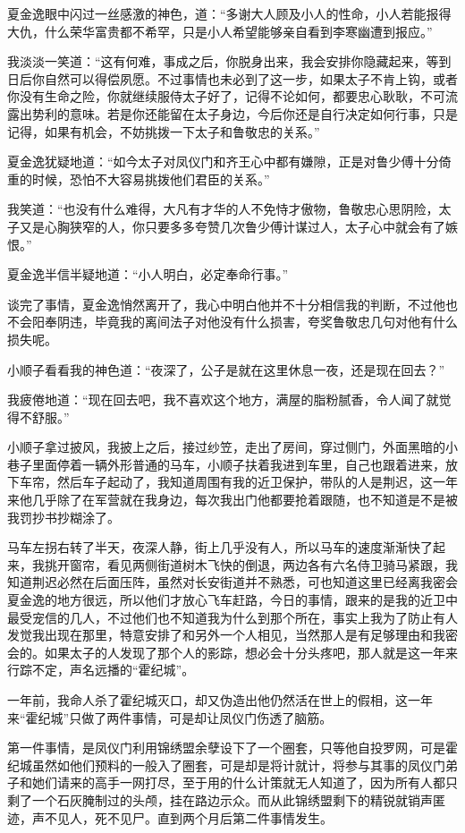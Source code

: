 夏金逸眼中闪过一丝感激的神色，道：“多谢大人顾及小人的性命，小人若能报得大仇，什么荣华富贵都不希罕，只是小人希望能够亲自看到李寒幽遭到报应。”

我淡淡一笑道：“这有何难，事成之后，你脱身出来，我会安排你隐藏起来，等到日后你自然可以得偿夙愿。不过事情也未必到了这一步，如果太子不肯上钩，或者你没有生命之险，你就继续服侍太子好了，记得不论如何，都要忠心耿耿，不可流露出势利的意味。若是你还能留在太子身边，今后你还是自行决定如何行事，只是记得，如果有机会，不妨挑拨一下太子和鲁敬忠的关系。”

夏金逸犹疑地道：“如今太子对凤仪门和齐王心中都有嫌隙，正是对鲁少傅十分倚重的时候，恐怕不大容易挑拨他们君臣的关系。”

我笑道：“也没有什么难得，大凡有才华的人不免恃才傲物，鲁敬忠心思阴险，太子又是心胸狭窄的人，你只要多多夸赞几次鲁少傅计谋过人，太子心中就会有了嫉恨。”

夏金逸半信半疑地道：“小人明白，必定奉命行事。”

谈完了事情，夏金逸悄然离开了，我心中明白他并不十分相信我的判断，不过他也不会阳奉阴违，毕竟我的离间法子对他没有什么损害，夸奖鲁敬忠几句对他有什么损失呢。

小顺子看看我的神色道：“夜深了，公子是就在这里休息一夜，还是现在回去？”

我疲倦地道：“现在回去吧，我不喜欢这个地方，满屋的脂粉腻香，令人闻了就觉得不舒服。”

小顺子拿过披风，我披上之后，接过纱笠，走出了房间，穿过侧门，外面黑暗的小巷子里面停着一辆外形普通的马车，小顺子扶着我进到车里，自己也跟着进来，放下车帘，然后车子起动了，我知道周围有我的近卫保护，带队的人是荆迟，这一年来他几乎除了在军营就在我身边，每次我出门他都要抢着跟随，也不知道是不是被我罚抄书抄糊涂了。

马车左拐右转了半天，夜深人静，街上几乎没有人，所以马车的速度渐渐快了起来，我挑开窗帘，看见两侧街道树木飞快的倒退，两边各有六名侍卫骑马紧跟，我知道荆迟必然在后面压阵，虽然对长安街道并不熟悉，可也知道这里已经离我密会夏金逸的地方很远，所以他们才放心飞车赶路，今日的事情，跟来的是我的近卫中最受宠信的几人，不过他们也不知道我为什么到那个所在，事实上我为了防止有人发觉我出现在那里，特意安排了和另外一个人相见，当然那人是有足够理由和我密会的。如果太子的人发现了那个人的影踪，想必会十分头疼吧，那人就是这一年来行踪不定，声名远播的“霍纪城”。

一年前，我命人杀了霍纪城灭口，却又伪造出他仍然活在世上的假相，这一年来“霍纪城”只做了两件事情，可是却让凤仪门伤透了脑筋。

第一件事情，是凤仪门利用锦绣盟余孽设下了一个圈套，只等他自投罗网，可是霍纪城虽然如他们预料的一般入了圈套，可是却是将计就计，将参与其事的凤仪门弟子和她们请来的高手一网打尽，至于用的什么计策就无人知道了，因为所有人都只剩了一个石灰腌制过的头颅，挂在路边示众。而从此锦绣盟剩下的精锐就销声匿迹，声不见人，死不见尸。直到两个月后第二件事情发生。

